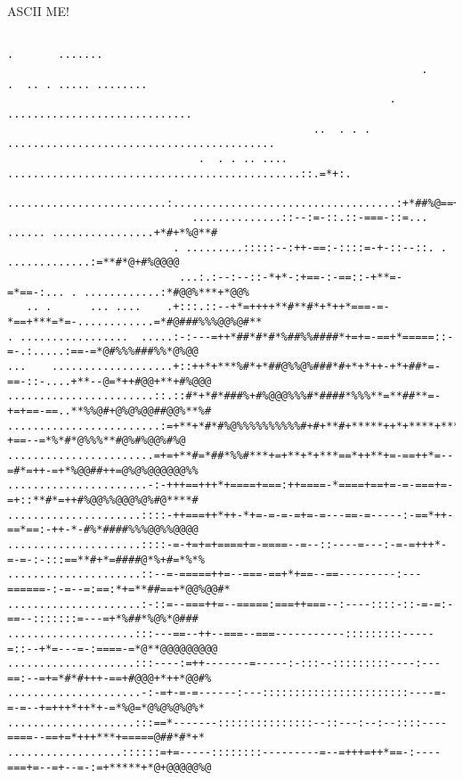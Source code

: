 \documentclass[12pt]{article}
\begin{document}
\newpage
\centerline{\large ASCII ME!}

\scriptsize
\begin{verbatim}
                                                                                     .       .......
                                                                 .            .  .. . ..... ........
                                                            .          .............................
                                                ..  . . . ..........................................
                              .  . . .. ....  ..............................................::.=*+:.
                             .........................:...................................:+*##%@==+
                             ..............::--:=-::.::-===-::=... ...... ................+*#+*%@**#
                          . .........:::::--:++-==:-::::=-+-::--::. .    .............:=**#*@+#%@@@@
                           ...:.:--:--::-*+*-:+==-:-==::-+**=-=*==-:... . ............:*#@@%***+*@@%
   .. .      ... ....    .+:::.::--+*=++++**#**#*+*++*===-=-*==+***=*=-............=*#@###%%%@@%@#**
. .................  .....:-:---=++*##*#*#*%##%%####*+=+=-==+*=====::-=-.:.....:==-=*@#%%%###%%*@%@@
...    ...................+::++*+***%#*+*##@%%@%###*#+*+*++-+*+##*=-==-::-....+**--@=*++#@@+**+#%@@@
.......................::.::#*+*#*###%+#%@@@%%%#*####*%%%**=**##**=-+=+==-==..**%%@#+@%@%@@##@@%**%#
........................:=+**+*#*#%@%%%%%%%%%%#+#+**#+*****++*+****+***-+==--=*%*#*@%%%**#@%#%@@%#%@
.......................=+=+**#=*##*%%#***+=+**+*+***==*++**+=-==++*=--=#*=++-=+*%@@##++=@%@%@@@@@@%%
......................-:-+++==+++*+====+===:++====-*====+==+=-=-===+=-=+::**#*=++#%@@%%@@@%@%#@****#
.....................::::-++===++*++-*+=-=-=-=+=-=---==-=-----:-==*++-==*==:-++-*-#%*####%%%@@%%@@@@
.....................::::-=-+=+=+====+=-====--=--::----=---:-=-=+++*-=-=-:-:::==**#+*=####@*%+#=*%*%
.....................::--=-=====++=--===-==+*+==--==---------:---======-:-=--=:==:*+=**##==+*@@%@@#*
.....................:-::=--===++=--=====:===++===--:----::::-::-=-=:-==--:::::::=---=+*%##*%@%*@###
....................:::---==--++--===--===-----------:::::::::-----=::--+*=---=-:====-=*@**@@@@@@@@@
....................:::----:=++-------=-----:-:::--:::::::::----:---==:--=+=*#*#+++-==+#@@@+*++*@@#%
.....................-:-=+-=-=------:---:::::::::::::::::::::::----=-=-=--+=+++*++*+-=*%@=*@%@%@%@%*
....................:::==*-------:::::::::::::::--::---:--:--::::----====--==+=*+++***+=====@##*#*+*
..................::::::=+=-----::::::::---------=--=+++=++*==-:----===+=--=+--=-:=+*****+*@+@@@@@%@

\end{verbatim}
\end{document}
